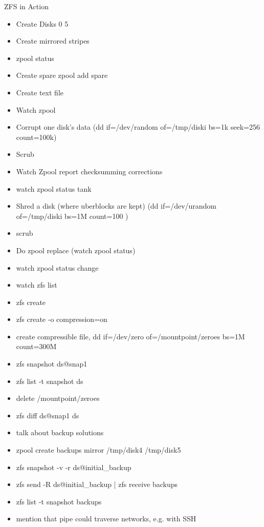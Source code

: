 
\begin{frame}{ZFS in Action}
	\begin{itemize}
		\item Create Disks 0 5
		\item Create mirrored stripes
		\item zpool status
		\item Create spare zpool add spare
		\item Create text file
		\item Watch zpool 
		\item Corrupt one disk's data (dd if=/dev/random of=/tmp/diski bs=1k seek=256 count=100k)
		\item Scrub
		\item Watch Zpool report checksumming corrections
		\item watch zpool status tank
		\item Shred a disk (where uberblocks are kept) (dd if=/dev/urandom of=/tmp/diski bs=1M count=100 )
		\item scrub
		\item Do zpool replace (watch zpool status)
		\item watch zpool status change
		\item watch zfs list
		\item zfs create
		\item zfs create -o compression=on
		\item create compressible file, dd if=/dev/zero of=/mountpoint/zeroes bs=1M count=300M
		\item zfs snapshot ds@snap1
		\item zfs list -t snapshot ds
		\item delete /mountpoint/zeroes
		\item zfs diff ds@snap1 ds
		\item talk about backup solutions
		\item zpool create backups mirror /tmp/disk4 /tmp/disk5
		\item zfs snapshot -v -r ds@initial\_backup
		\item zfs send -R ds@initial\_backup | zfs receive backups
		\item zfs list -t snapshot backups
		\item mention that pipe could traverse networks, e.g. with SSH
	\end{itemize}
\end{frame}